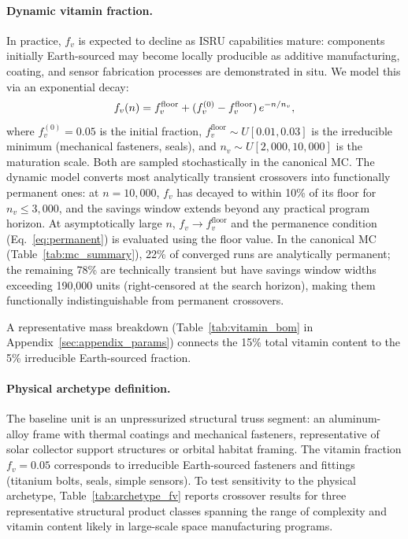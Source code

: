 \documentclass[5p,twocolumn]{elsarticle}
\begin{document}
\paragraph{Dynamic vitamin fraction.} In practice, $f_v$ is expected to decline as ISRU capabilities mature: components initially Earth-sourced may become locally producible as additive manufacturing, coating, and sensor fabrication processes are demonstrated in situ. We model this via an exponential decay:
\begin{equation}\small
  f_v(n) = f_v^{\mathrm{floor}} + (f_v^{(0)} - f_v^{\mathrm{floor}}) \, e^{-n/n_v},
  \label{eq:vitamin_dynamic}
\end{equation}
where $f_v^{(0)} = 0.05$ is the initial fraction, $f_v^{\mathrm{floor}} \sim U[0.01, 0.03]$ is the irreducible minimum (mechanical fasteners, seals), and $n_v \sim U[2{,}000, 10{,}000]$ is the maturation scale. Both are sampled stochastically in the canonical MC. The dynamic model converts most analytically transient crossovers into functionally permanent ones: at $n = 10{,}000$, $f_v$ has decayed to within 10\% of its floor for $n_v \leq 3{,}000$, and the savings window extends beyond any practical program horizon. At asymptotically large $n$, $f_v \to f_v^{\mathrm{floor}}$ and the permanence condition (Eq.~\ref{eq:permanent}) is evaluated using the floor value. In the canonical MC (Table~\ref{tab:mc_summary}), 22\% of converged runs are analytically permanent; the remaining 78\% are technically transient but have savings window widths exceeding 190{,}000 units (right-censored at the search horizon), making them functionally indistinguishable from permanent crossovers.

A representative mass breakdown (Table~\ref{tab:vitamin_bom} in Appendix~\ref{sec:appendix_params}) connects the 15\% total vitamin content to the 5\% irreducible Earth-sourced fraction.

\paragraph{Physical archetype definition.}
\label{sec:archetype}
The baseline unit is an unpressurized structural truss segment: an aluminum-alloy frame with thermal coatings and mechanical fasteners, representative of solar collector support structures or orbital habitat framing. The vitamin fraction $f_v = 0.05$ corresponds to irreducible Earth-sourced fasteners and fittings (titanium bolts, seals, simple sensors). To test sensitivity to the physical archetype, Table~\ref{tab:archetype_fv} reports crossover results for three representative structural product classes spanning the range of complexity and vitamin content likely in large-scale space manufacturing programs.
\end{document}
